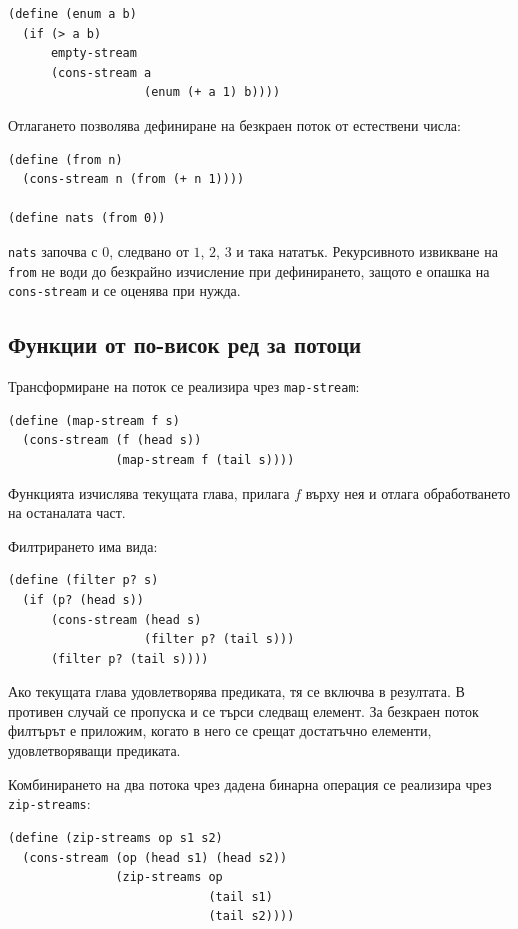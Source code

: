 \begin{verbatim}
(define (enum a b)
  (if (> a b)
      empty-stream
      (cons-stream a
                   (enum (+ a 1) b))))
\end{verbatim}

Отлагането позволява дефиниране на безкраен поток от естествени числа:

\begin{verbatim}
(define (from n)
  (cons-stream n (from (+ n 1))))

(define nats (from 0))
\end{verbatim}

\texttt{nats} започва с $0$, следвано от $1$, $2$, $3$ и така нататък. Рекурсивното извикване на \texttt{from} не води до безкрайно изчисление при дефинирането, защото е опашка на \texttt{cons-stream} и се оценява при нужда.

\subsection{Функции от по-висок ред за потоци}\label{s:20.5.4}

Трансформиране на поток се реализира чрез \texttt{map-stream}:

\begin{verbatim}
(define (map-stream f s)
  (cons-stream (f (head s))
               (map-stream f (tail s))))
\end{verbatim}

Функцията изчислява текущата глава, прилага $f$ върху нея и отлага обработването на останалата част.

Филтрирането има вида:

\begin{verbatim}
(define (filter p? s)
  (if (p? (head s))
      (cons-stream (head s)
                   (filter p? (tail s)))
      (filter p? (tail s))))
\end{verbatim}

Ако текущата глава удовлетворява предиката, тя се включва в резултата. В противен случай се пропуска и се търси следващ елемент. За безкраен поток филтърът е приложим, когато в него се срещат достатъчно елементи, удовлетворяващи предиката.

Комбинирането на два потока чрез дадена бинарна операция се реализира чрез \texttt{zip-streams}:

\begin{verbatim}
(define (zip-streams op s1 s2)
  (cons-stream (op (head s1) (head s2))
               (zip-streams op
                            (tail s1)
                            (tail s2))))
\end{verbatim}

